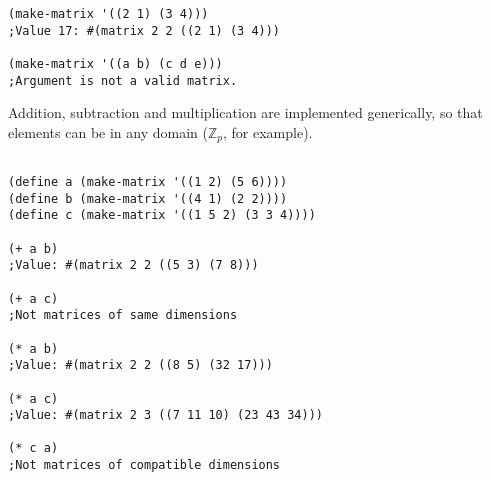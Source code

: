 \documentclass{article}
\begin{document}
\begin{verbatim}
(make-matrix '((2 1) (3 4)))
;Value 17: #(matrix 2 2 ((2 1) (3 4)))

(make-matrix '((a b) (c d e)))
;Argument is not a valid matrix.
\end{verbatim}
				
				Addition, subtraction and multiplication are implemented generically, so that elements can be in any domain ($\mathbb{Z}_p$, for example).

\begin{minipage}[t]{0.6\textwidth}
\begin{verbatim}

(define a (make-matrix '((1 2) (5 6))))
(define b (make-matrix '((4 1) (2 2))))
(define c (make-matrix '((1 5 2) (3 3 4))))

(+ a b)
;Value: #(matrix 2 2 ((5 3) (7 8)))

(+ a c)
;Not matrices of same dimensions

(* a b)
;Value: #(matrix 2 2 ((8 5) (32 17)))

(* a c)
;Value: #(matrix 2 3 ((7 11 10) (23 43 34)))

(* c a)
;Not matrices of compatible dimensions
\end{verbatim}
\end{minipage}
\end{document}
